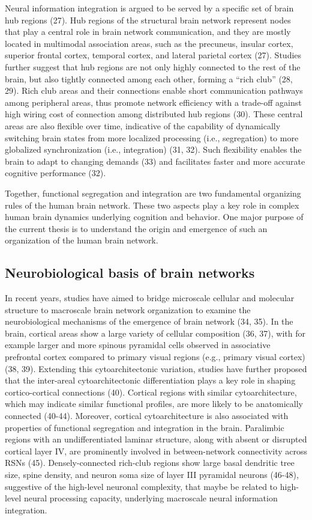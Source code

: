 \begin{refsection}
Neural information integration is argued to be served by a specific set of brain hub regions (27). Hub regions of the structural brain network represent nodes that play a central role in brain network communication, and they are mostly located in multimodal association areas, such as the precuneus, insular cortex, superior frontal cortex, temporal cortex, and lateral parietal cortex (27). Studies further suggest that hub regions are not only highly connected to the rest of the brain, but also tightly connected among each other, forming a “rich club”  (28, 29). Rich club areas and their connections enable short communication pathways among peripheral areas, thus promote network efficiency with a trade-off against high wiring cost of connection among distributed hub regions (30). These central areas are also flexible over time, indicative of the capability of dynamically switching brain states from more localized processing (i.e., segregation) to more globalized synchronization (i.e., integration) (31, 32). Such flexibility enables the brain to adapt to changing demands (33) and facilitates faster and more accurate cognitive performance (32). 

Together, functional segregation and integration are two fundamental organizing rules of the human brain network. These two aspects play a key role in complex human brain dynamics underlying cognition and behavior. One major purpose of the current thesis is to understand the origin and emergence of such an organization of the human brain network.

\subsection*{Neurobiological basis of brain networks}
In recent years, studies have aimed to bridge microscale cellular and molecular structure to macroscale brain network organization to examine the neurobiological mechanisms of the emergence of brain network (34, 35). In the brain, cortical areas show a large variety of cellular composition (36, 37), with for example larger and more spinous pyramidal cells observed in associative prefrontal cortex compared to primary visual regions (e.g., primary visual cortex) (38, 39). Extending this cytoarchitectonic variation, studies have further proposed that the inter-areal cytoarchitectonic differentiation plays a key role in shaping cortico-cortical connections (40). Cortical regions with similar cytoarchitecture, which may indicate similar functional profiles, are more likely to be anatomically connected (40-44). Moreover, cortical cytoarchitecture is also associated with properties of functional segregation and integration in the brain. Paralimbic regions with an undifferentiated laminar structure, along with absent or disrupted cortical layer IV, are prominently involved in between-network connectivity across RSNs (45). Densely-connected rich-club regions show large basal dendritic tree size, spine density, and neuron soma size of layer III pyramidal neurons (46-48), suggestive of the high-level neuronal complexity, that maybe be related to high-level neural processing capacity, underlying macroscale neural information integration. 


\end{refsection}
